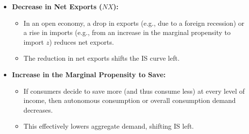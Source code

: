 \begin{itemize}
\begin{itemize}
    \end{itemize}
    \item \textbf{Decrease in Net Exports ($NX$):}
    \begin{itemize}
        \item In an open economy, a drop in exports (e.g., due to a foreign recession) or a rise in imports (e.g., from an increase in the marginal propensity to import $z$) reduces net exports.
        \item The reduction in net exports shifts the IS curve left.
    \end{itemize}
    \item \textbf{Increase in the Marginal Propensity to Save:}
    \begin{itemize}
        \item If consumers decide to save more (and thus consume less) at every level of income, then autonomous consumption or overall consumption demand decreases.
        \item This effectively lowers aggregate demand, shifting IS left.
    \end{itemize}
\end{itemize}

